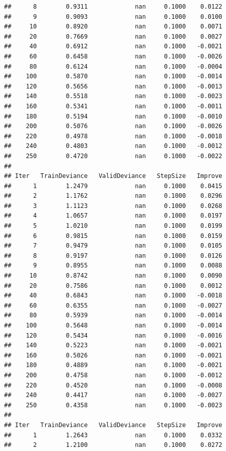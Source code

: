 \documentclass[
]{book}
\begin{document}
\begin{verbatim}
##      8        0.9311             nan     0.1000    0.0122
##      9        0.9093             nan     0.1000    0.0100
##     10        0.8920             nan     0.1000    0.0071
##     20        0.7669             nan     0.1000    0.0027
##     40        0.6912             nan     0.1000   -0.0021
##     60        0.6458             nan     0.1000   -0.0026
##     80        0.6124             nan     0.1000   -0.0004
##    100        0.5870             nan     0.1000   -0.0014
##    120        0.5656             nan     0.1000   -0.0013
##    140        0.5518             nan     0.1000   -0.0023
##    160        0.5341             nan     0.1000   -0.0011
##    180        0.5194             nan     0.1000   -0.0010
##    200        0.5076             nan     0.1000   -0.0026
##    220        0.4978             nan     0.1000   -0.0018
##    240        0.4803             nan     0.1000   -0.0012
##    250        0.4720             nan     0.1000   -0.0022
## 
## Iter   TrainDeviance   ValidDeviance   StepSize   Improve
##      1        1.2479             nan     0.1000    0.0415
##      2        1.1762             nan     0.1000    0.0296
##      3        1.1123             nan     0.1000    0.0268
##      4        1.0657             nan     0.1000    0.0197
##      5        1.0210             nan     0.1000    0.0199
##      6        0.9815             nan     0.1000    0.0159
##      7        0.9479             nan     0.1000    0.0105
##      8        0.9197             nan     0.1000    0.0126
##      9        0.8955             nan     0.1000    0.0088
##     10        0.8742             nan     0.1000    0.0090
##     20        0.7586             nan     0.1000    0.0012
##     40        0.6843             nan     0.1000   -0.0018
##     60        0.6355             nan     0.1000   -0.0027
##     80        0.5939             nan     0.1000   -0.0014
##    100        0.5648             nan     0.1000   -0.0014
##    120        0.5434             nan     0.1000   -0.0016
##    140        0.5223             nan     0.1000   -0.0021
##    160        0.5026             nan     0.1000   -0.0021
##    180        0.4889             nan     0.1000   -0.0021
##    200        0.4758             nan     0.1000   -0.0012
##    220        0.4520             nan     0.1000   -0.0008
##    240        0.4417             nan     0.1000   -0.0027
##    250        0.4358             nan     0.1000   -0.0023
## 
## Iter   TrainDeviance   ValidDeviance   StepSize   Improve
##      1        1.2643             nan     0.1000    0.0332
##      2        1.2100             nan     0.1000    0.0272

\end{verbatim}
\end{document}
